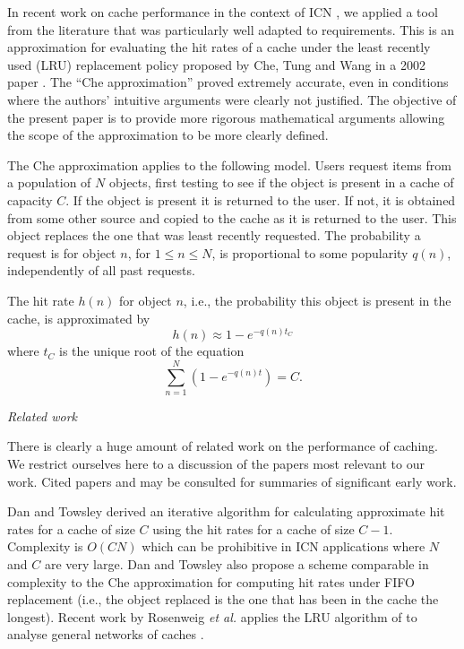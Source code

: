 \documentclass{amsart}
\def\etal{{\em et al. }}
\begin{document}
In recent work on cache performance in the context of ICN \cite{FRRS12}, we applied a tool from the literature that was particularly well adapted to requirements. This is an approximation for evaluating the hit rates of a cache under the least recently used (LRU) replacement policy proposed by Che, Tung and Wang in a 2002 paper  \cite{CTW02}.  The ``Che approximation'' proved extremely accurate, even in conditions where the authors' intuitive arguments were clearly not justified. The objective of the present paper is to provide more rigorous mathematical arguments allowing the scope of the approximation to be more clearly defined.  

The Che approximation applies to the following model. Users request items from a population of $N$ objects, first testing to see if the object is present in a cache of capacity $C$. If the object is present it is returned to the user. If not, it is obtained from some other source and copied to the cache as it is returned to the user. This object replaces the one that was least recently requested. The probability a request is for object $n$, for $1\le n \le N$, is proportional to some popularity $q(n)$, independently of all past requests. 

The hit rate $h(n)$ for object $n$, i.e., the probability this object is present in the cache, is approximated by 
$$h(n) \approx 1-e^{-q(n)t_C}$$
where $t_C$ is the unique root of the equation
\begin{equation*}
 \sum_{n=1}^N (1-e^{-q(n)t})= C.
 \end{equation*}



\noindent \emph{Related work}

There is clearly a huge amount of related work on the performance of caching. We restrict ourselves here to a discussion of the papers most relevant to our work. Cited papers \cite{DT90} and \cite{Jelenkovic99} may be consulted for summaries of significant early work. 

Dan and Towsley \cite{DT90} derived an iterative algorithm for calculating approximate hit rates for a cache of size $C$ using the hit rates for a cache of size $C-1$. Complexity is $O(CN)$ which can be prohibitive in ICN applications where $N$ and $C$ are very large.  Dan and Towsley also propose a scheme comparable in complexity to the Che approximation for computing hit rates under FIFO replacement (i.e., the object  replaced is the one that has been in the cache the longest). Recent work by Rosenweig \etal applies the LRU algorithm of \cite{DT90} to analyse general networks of caches \cite{RKT2010}. 
\end{document}
